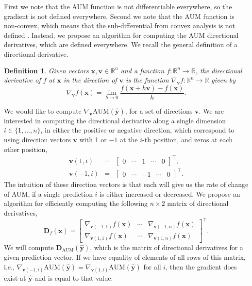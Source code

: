 \documentclass{article}
\newtheorem{definition}{Definition}
\begin{document}
First we note that the AUM function is not differentiable everywhere, so the gradient is not defined everywhere.
Second we note that the AUM function is non-convex, which means that the sub-differential from convex analysis is not defined \citep{rockafellar-1970a}.
Instead, we propose an algorithm for computing the AUM directional derivatives, which are defined everywhere. 
We recall the general definition of a directional derivative.

\begin{definition}
Given vectors $\mathbf x,\mathbf v\in\mathbb R^n$ and a function $f:\mathbb R^n\rightarrow \mathbb R$, the directional derivative of $f$ at $\mathbf x$ in the direction of $\mathbf v$ is the function $\nabla_{\mathbf v} f: \mathbb R^n \rightarrow \mathbb R$ given by
\begin{equation}
\label{eq:directional-derivative}
    \nabla_{\mathbf v} f(\mathbf x) = 
    \lim_{h\rightarrow 0}
    \frac{f(\mathbf x + h\mathbf v) - 
    f(\mathbf x)}{h}.
\end{equation}
\end{definition}
We would like to compute $\nabla_{\mathbf v}\text{AUM}(\mathbf{\hat y})$, for a set of directions $\mathbf v$.
We are interested in computing the directional derivative along a single dimension $i\in\{1,\dots,n\}$, in either the positive or negative direction, which correspond to using direction vectors $\mathbf v$ with 1 or $-1$ at the $i$-th position, and zeros at each other position, 
\begin{eqnarray}
\mathbf v(1, i) &=& \left[\begin{array}{ccccc}
0 & \cdots & 1 & \cdots & 0
\end{array}\right]^\intercal,
\\
\mathbf v(-1, i) &=& \left[\begin{array}{ccccc}
0 & \cdots & -1 & \cdots & 0
\end{array}\right]^\intercal.
\end{eqnarray}
The intuition of these direction vectors is that each will give us the rate of change of AUM, if a single prediction $i$ is either increased or decreased.
We propose an algorithm for efficiently computing the following $n\times 2$ matrix of directional derivatives,
\begin{equation}
\mathbf D_f(\mathbf x) = 
    \left[\begin{array}{ccc}
\nabla_{\mathbf v(-1,1)} f(\mathbf x) &
\cdots &
\nabla_{\mathbf v(-1,n)} f(\mathbf x) \\
\nabla_{\mathbf v(1,1)} f(\mathbf x) &
\cdots &
\nabla_{\mathbf v(1,n)} f(\mathbf x) 
    \end{array}\right]^\intercal.
\end{equation}
We will compute $\mathbf D_\text{AUM}(\mathbf {\hat y})$, which is the matrix of directional derivatives for a given prediction vector.
If we have equality of elements of all rows of this matrix, i.e., $
\nabla_{\mathbf v(-1,i)} \text{AUM}(\mathbf {\hat y})
=
\nabla_{\mathbf v(1,i)} \text{AUM}(\mathbf {\hat y})$ for all $i$, then the gradient does exist at $\mathbf {\hat y}$ and is equal to that value.
\end{document}
